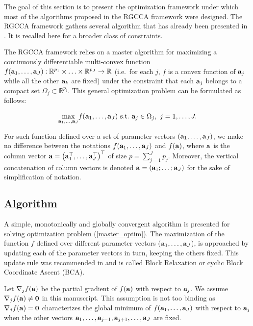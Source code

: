 \documentclass[
]{jss}
\begin{document}
The goal of this section is to present the optimization framework under
which most of the algorithms proposed in the RGCCA framework were
designed. The RGCCA framework gathers several algorithm that has already
been presented in \citep[\citet{Tenenhaus2014}, \citet{Tenenhaus2015},
\citet{Tenenhaus2017}]{Tenenhaus2011}. It is recalled here for a broader
class of constraints.

The RGCCA framework relies on a master algorithm for maximizing a
continuously differentiable multi-convex function
\(f(\mathbf{a}_1, \ldots,\mathbf{a}_J):\mathbb{R}^{p_1}\times \ldots \times \mathbb{R}^{p_J} \xrightarrow{}\mathbb{R}\)
(i.e.~for each \(j\), \(f\) is a convex function of \(\mathbf{a}_j\) while
all the other \(\mathbf{a}_k\) are fixed) under the constraint that each
\(\mathbf{a}_j\) belongs to a compact set
\(\Omega_j\subset \mathbb{R}^{p_j}\). This general optimization problem
can be formulated as follows:

\begin{align}
\underset{\mathbf{a}_1, \ldots,\mathbf{a}_J}{\text{max}} f(\mathbf{a}_1, \ldots,\mathbf{a}_J)
\text{~s.t.~} \mathbf{a}_j \in \Omega_j, ~ j = 1, \ldots, J.
\label{master_optim}
\end{align}

For such function defined over a set of parameter vectors
\((\mathbf{a}_1, \ldots,\mathbf{a}_J)\), we make no difference between the
notations \(f(\mathbf{a}_1, \ldots,\mathbf{a}_J)\) and \(f(\mathbf{a})\), where
\(\mathbf{a}\) is the column vector
\(\mathbf{a} = \left( \mathbf{a}_1^\top, \ldots, \mathbf{a}_J^\top\right)^\top\) of
size \(p = \sum_{j=1}^{J}p_j\). Moreover, the vertical concatenation of
column vectors is denoted
\(\mathbf{a} = \left( \mathbf{a}_1; \ldots; \mathbf{a}_J \right)\) for the sake of
simplification of notation.

\hypertarget{algorithm}{%
\subsection{Algorithm}\label{algorithm}}

A simple, monotonically and globally convergent algorithm is presented
for solving optimization problem (\ref{master_optim}). The maximization
of the function \(f\) defined over different parameter vectors
(\(\mathbf{a}_1, \ldots,\mathbf{a}_J\)), is approached by updating each of the
parameter vectors in turn, keeping the others fixed. This update rule
was recommended in \citep{DeLeeuw1994} and is called Block Relaxation or
cyclic Block Coordinate Ascent (BCA).

Let \(\nabla_j f(\mathbf{a})\) be the partial gradient of \(f(\mathbf{a})\) with
respect to \(\mathbf{a}_j\). We assume \(\nabla_j f(\mathbf{a}) \neq \mathbf{0}\)
in this manuscript. This assumption is not too binding as
\(\nabla_j f(\mathbf{a}) = \mathbf{0}\) characterizes the global minimum of
\(f(\mathbf{a}_1 , \ldots , \mathbf{a}_J )\) with respect to \(\mathbf{a}_j\) when the
other vectors
\(\mathbf{a}_1 , \ldots , \mathbf{a}_{j-1} , \mathbf{a}_{j+1} , \ldots , \mathbf{a}_J\) are
fixed.
\end{document}
